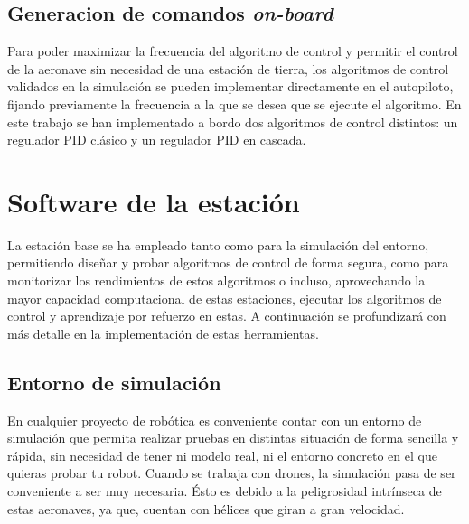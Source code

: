 \subsection{Generacion de comandos \textit{on-board}}
	Para poder maximizar la frecuencia del algoritmo de control y permitir el control de la aeronave sin necesidad de una estación de tierra, los algoritmos de control validados en la simulación se pueden implementar directamente en el autopiloto, fijando previamente la frecuencia a la que se desea que se ejecute el algoritmo. 
	En este trabajo se han implementado a bordo dos algoritmos de control distintos: un regulador PID clásico y un regulador PID en cascada.
	
\section{Software de la estación}

La estación base se ha empleado tanto como para la simulación del entorno, permitiendo diseñar y probar algoritmos de control de forma segura, como para monitorizar los rendimientos de estos algoritmos o incluso, aprovechando la mayor capacidad computacional de estas estaciones, ejecutar los algoritmos de control y aprendizaje por refuerzo en estas.
A continuación se profundizará con más detalle en la implementación de estas herramientas. 


\subsection{Entorno de simulación}

En cualquier proyecto de robótica es conveniente contar con un entorno de simulación que permita realizar pruebas en distintas situación de forma sencilla y rápida, sin necesidad de tener ni modelo real, ni el entorno concreto en el que quieras probar tu robot. Cuando se trabaja con drones, la simulación pasa de ser conveniente a ser muy necesaria. Ésto es debido a la peligrosidad intrínseca de estas aeronaves, ya que, cuentan con hélices que giran a gran velocidad.


